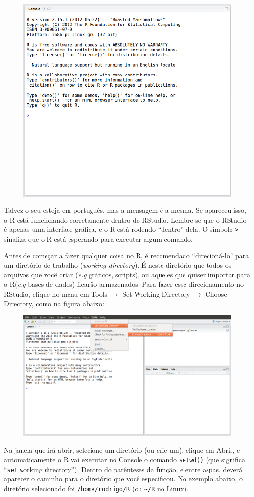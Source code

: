 \documentclass[a4paper,12pt]{article}\usepackage[]{graphicx}\usepackage[]{color}
\providecommand{\eg}{\textit{e.g}\xspace}
\providecommand{\R}{\textsf{R}\xspace}
\providecommand{\RStudio}{\textsf{RStudio}\xspace}
\begin{document}
\begin{figure}[H]
  \centering
  \includegraphics[width=.7\textwidth]{figure/Selection_011}
\end{figure}

Talvez o seu esteja em português, mas a mensagem é a mesma. Se apareceu
isso, o \R está funcionando corretamente dentro do
\RStudio. Lembre-se que o \RStudio é apenas uma interface
gráfica, e o \R está rodendo ``dentro'' dela.  O símbolo \texttt{>}
sinaliza que o \R está esperando para executar algum comando.

Antes de começar a fazer qualquer coisa no \R, é recomendado
``direcioná-lo'' para um diretório de trabalho (\textit{working
  directory}). É neste diretório que todos os arquivos que você criar
(\eg gráficos, scripts), ou aqueles que quiser importar para o \R (\eg
bases de dados) ficarão armazenados. Para fazer esse direcionamento no
\RStudio, clique no menu em \textsf{Tools $\rightarrow$ Set Working
  Directory $\rightarrow$ Choose Directory}, como na figura abaixo:

\begin{figure}[H]
  \centering
  \includegraphics[width=\textwidth]{figure/RStudio_005}
\end{figure}
Na janela que irá abrir, selecione um diretório (ou crie um), clique em
\textsf{Abrir}, e automaticamente o \R vai executar no \textsf{Console}
o comando \texttt{setwd()} (que significa ``\texttt{set} \texttt{w}orking
\texttt{d}irectory''). Dentro do parênteses da função, e entre aspas,
deverá aparecer o caminho para o diretório que você especificou. No
exemplo abaixo, o diretório selecionado foi \texttt{/home/rodrigo/R}
(ou \verb|~/R| no Linux).
\end{document}
